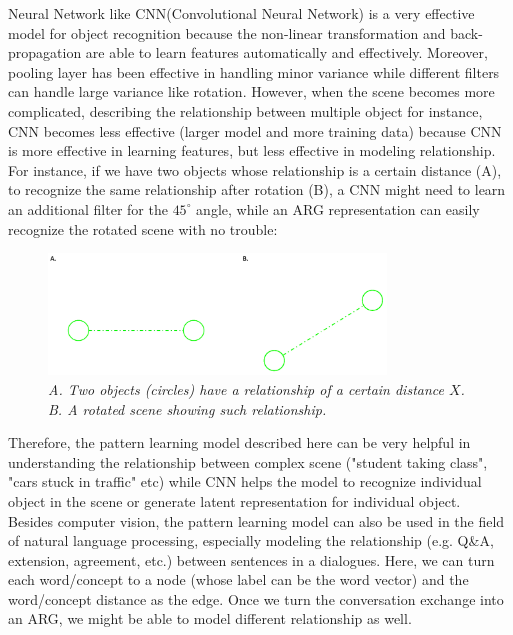 Neural Network like CNN(Convolutional Neural Network) is a very effective model for object recognition because the non-linear transformation and back-propagation are able to learn features automatically and effectively. Moreover, pooling layer has been effective in handling minor variance while different filters can handle large variance like rotation\footnotemark. However, when the scene becomes more complicated, describing the relationship between multiple object for instance, CNN becomes less effective (larger model and more training data) because CNN is more effective in learning features, but less effective in modeling relationship. For instance, if we have two objects whose relationship is a certain distance (A), to recognize the same relationship after rotation (B), a CNN might need to learn an additional filter for the $45^\circ$ angle, while an ARG representation can easily recognize the rotated scene with no trouble:\\

\begin{figure}[h]
	\centering
	\captionsetup{justification=centering}
	\includegraphics[width=0.8\textwidth]{figs/rotation.png}
	\caption[Caption for LOF]{\emph{A. Two objects (circles) have a relationship of a certain distance $X$.\\ B. A rotated scene showing such relationship. }}
	\label{fig:rotation}
\end{figure}

Therefore, the pattern learning model described here can be very helpful in understanding the relationship between complex scene ("student taking class", "cars stuck in traffic" etc) while CNN helps the model to recognize individual object in the scene or generate latent representation for individual object.\\

Besides computer vision, the pattern learning model can also be used in the field of natural language processing, especially modeling the relationship (e.g. Q\&A, extension, agreement, etc.) between sentences in a dialogues. Here, we can turn each word/concept to a node (whose label can be the word vector) and the word/concept distance as the edge. Once we turn the conversation exchange into an ARG, we might be able to model different relationship as well.\\

